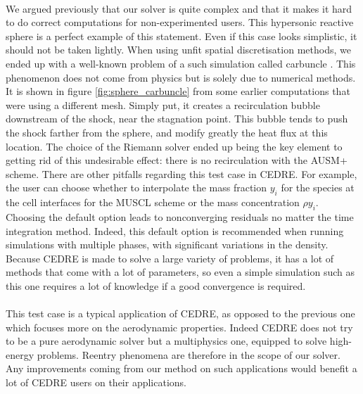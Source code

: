         \paragraph{}
        We argued previously that our solver is quite complex and that it makes it hard to do correct computations for non-experimented users.
        This hypersonic reactive sphere is a perfect example of this statement.
        Even if this case looks simplistic, it should not be taken lightly.
        When using unfit spatial discretisation methods, we ended up with a well-known problem of a such simulation called carbuncle \cite{MacCormack2013}.
        This phenomenon does not come from physics but is solely due to numerical methods.
        It is shown in figure \ref{fig:sphere_carbuncle} from some earlier computations that were using a different mesh.
        Simply put, it creates a recirculation bubble downstream of the shock, near the stagnation point.
        This bubble tends to push the shock farther from the sphere, and modify greatly the heat flux at this location.
        The choice of the Riemann solver ended up being the key element to getting rid of this undesirable effect: there is no recirculation with the AUSM+ scheme.
        There are other pitfalls regarding this test case in CEDRE.
        For example, the user can choose whether to interpolate the mass fraction $y_i$ for the species at the cell interfaces for the MUSCL scheme or the mass concentration $\rho y_i$.
        Choosing the default option leads to nonconverging residuals no matter the time integration method.
        Indeed, this default option is recommended when running simulations with multiple phases, with significant variations in the density.
        Because CEDRE is made to solve a large variety of problems, it has a lot of methods that come with a lot of parameters, so even a simple simulation such as this one requires a lot of knowledge if a good convergence is required.

        \paragraph{}
        This test case is a typical application of CEDRE, as opposed to the previous one which focuses more on the aerodynamic properties.
        Indeed CEDRE does not try to be a pure aerodynamic solver but a multiphysics one, equipped to solve high-energy problems.
        Reentry phenomena are therefore in the scope of our solver.
        Any improvements coming from our method on such applications would benefit a lot of CEDRE users on their applications.



